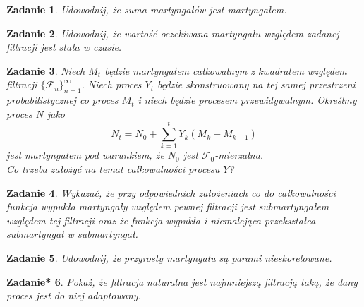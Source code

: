\documentclass{mwart}
\newtheorem{zd}{Zadanie}
\newtheorem{zdt}[zd]{Zadanie*}
\begin{document}
\begin{zd}
Udowodnij, że suma martyngałów jest martyngałem.
\end{zd}

\begin{zd}
Udowodnij, że wartość oczekiwana martyngału względem zadanej filtracji jest stała w czasie.
\end{zd}

\begin{zd}
Niech $M_t$ będzie martyngałem całkowalnym z kwadratem względem filtracji $\{\mathcal{F}_n\}_{n=1}^{\infty}$. Niech proces $Y_t$ będzie skonstruowany na tej samej przestrzeni probabilistycznej co proces $M_t$ i niech będzie procesem przewidywalnym. Określmy proces $N$ jako
\begin{displaymath}
N_t = N_0 + \sum_{k=1}^tY_k\left(M_k - M_{k-1}\right)
\end{displaymath}
jest martyngałem pod warunkiem, że $N_0$ jest $\mathcal{F}_0$-mierzalna.\\
Co trzeba założyć na temat całkowalności procesu $Y$?
\end{zd}

\begin{zd}
Wykazać, że przy odpowiednich założeniach co do całkowalności funkcja wypukła martyngały względem pewnej filtracji jest submartyngałem względem tej filtracji oraz że funkcja wypukła i niemalejąca przekształca submartyngał w submartyngał.
\end{zd}

\begin{zd}
Udowodnij, że przyrosty martyngału są parami nieskorelowane.
\end{zd}

\begin{zdt}
Pokaż, że filtracja naturalna jest najmniejszą filtracją taką, że dany proces jest do niej adaptowany.
\end{zdt}
\end{document}

